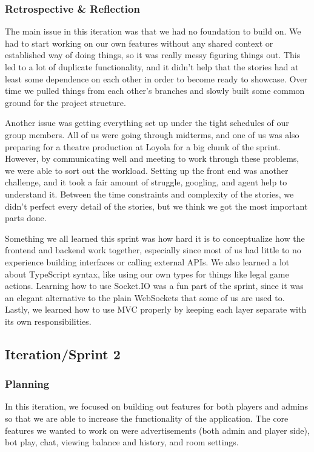 \documentclass{article}
\begin{document}
\subsubsection{Retrospective \& Reflection}
The main issue in this iteration was that we had no foundation to build on. We had to start working on our own features without any shared context or established way of doing things, so it was really messy figuring things out. This led to a lot of duplicate functionality, and it didn't help that the stories had at least some dependence on each other in order to become ready to showcase. Over time we pulled things from each other's branches and slowly built some common ground for the project structure.

Another issue was getting everything set up under the tight schedules of our group members. All of us were going through midterms, and one of us was also preparing for a theatre production at Loyola for a big chunk of the sprint. However, by communicating well and meeting to work through these problems, we were able to sort out the workload. Setting up the front end was another challenge, and it took a fair amount of struggle, googling, and agent help to understand it. Between the time constraints and complexity of the stories, we didn't perfect every detail of the stories, but we think we got the most important parts done.

Something we all learned this sprint was how hard it is to conceptualize how the frontend and backend work together, especially since most of us had little to no experience building interfaces or calling external APIs. We also learned a lot about TypeScript syntax, like using our own types for things like legal game actions. Learning how to use Socket.IO was a fun part of the sprint, since it was an elegant alternative to the plain WebSockets that some of us are used to. Lastly, we learned how to use MVC properly by keeping each layer separate with its own responsibilities.

\subsection{Iteration/Sprint 2}
\subsubsection{Planning}
In this iteration, we focused on building out features for both players and admins so that we are able to increase the functionality of the application. The core features we wanted to work on were advertisements (both admin and player side), bot play, chat, viewing balance and history, and room settings.
\end{document}
